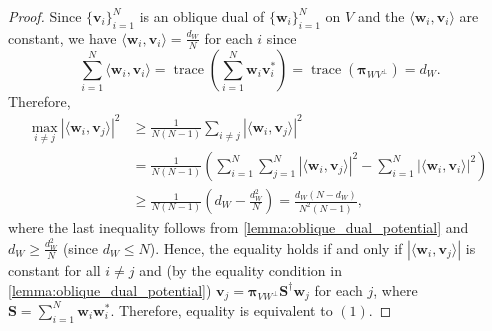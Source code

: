 \documentclass{amsart}
\numberwithin{equation}{section}
\DeclareMathOperator{\trace}{trace}
\newcommand{\bpi}{{\boldsymbol{\pi}}}
\theoremstyle{plain}
\theoremstyle{remark}
\theoremstyle{definition}
\begin{document}
\begin{proof}
Since $\{\mathbf{v}_i\}_{i=1}^N$ is an oblique dual of $\{\mathbf{w}_i\}_{i=1}^N$ on $V$ and the $\langle \mathbf{w}_i, \mathbf{v}_i \rangle$ are constant, we have 
$\langle \mathbf{w}_i, \mathbf{v}_i \rangle = \frac{d_W}{N}$ for each $i$ since
\begin{equation*}
   \sum_{i=1}^N \langle \mathbf{w}_i, \mathbf{v}_i \rangle = \trace\left( \sum_{i=1}^N \mathbf{w}_i \mathbf{v}_i^*\right)=\trace(\bpi_{WV^\perp}) =d_W. 
\end{equation*}
Therefore, 
    \begin{equation*}
    \begin{split}
        \underset{i \neq j}{\text{max}} \ |\langle \mathbf{w}_i, \mathbf{v}_j \rangle |^2 &\geq \frac{1}{N(N-1)} \sum_{i \neq j} |\langle \mathbf{w}_i, \mathbf{v}_j \rangle |^2 \\
        &= \frac{1}{N(N-1)} \left( \sum_{i=1}^N \sum_{j=1}^N | \langle \mathbf{w}_i, \mathbf{v}_j \rangle |^2 - \sum_{i=1}^N |\langle \mathbf{w}_i, \mathbf{v}_i \rangle |^2 \right) \\
        & \geq \frac{1}{N(N-1)} \left( d_W - \frac{d_W^2}{N} \right) = \frac{d_W(N-d_W)}{N^2(N-1)},
    \end{split}
    \end{equation*}
where the last inequality follows from \cref{lemma:oblique_dual_potential} and $d_W \geq \frac{d_W^2}{N}$ (since $d_W \leq N$).
Hence, the equality holds if and only if $|\langle \mathbf{w}_i, \mathbf{v}_j \rangle |$ is constant for all $ i \neq j$ and (by the equality condition in \cref{lemma:oblique_dual_potential}) $\mathbf{v}_j = \bpi_{VW^\perp} \mathbf{S}^\dagger \mathbf{w}_j$ for each $j$, where $\mathbf{S} = \sum\limits_{i=1}^N \mathbf{w}_i\mathbf{w}_i^*$. Therefore, equality is equivalent to $(1)$.


\end{proof}
\end{document}
